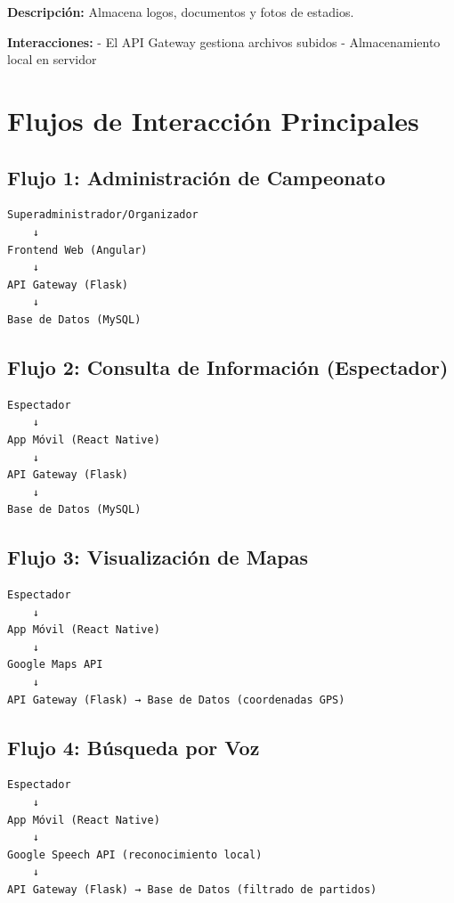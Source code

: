 \documentclass[
  spanish,
  11pt,
  letterpaper,
]{book}
\begin{document}
\textbf{Descripción:} Almacena logos, documentos y fotos de estadios.

\textbf{Interacciones:} - El API Gateway gestiona archivos subidos -
Almacenamiento local en servidor

\section{Flujos de Interacción
Principales}\label{flujos-de-interacciuxf3n-principales}

\subsection{Flujo 1: Administración de
Campeonato}\label{flujo-1-administraciuxf3n-de-campeonato}

\begin{verbatim}
Superadministrador/Organizador
    ↓
Frontend Web (Angular)
    ↓
API Gateway (Flask)
    ↓
Base de Datos (MySQL)
\end{verbatim}

\subsection{Flujo 2: Consulta de Información
(Espectador)}\label{flujo-2-consulta-de-informaciuxf3n-espectador}

\begin{verbatim}
Espectador
    ↓
App Móvil (React Native)
    ↓
API Gateway (Flask)
    ↓
Base de Datos (MySQL)
\end{verbatim}

\subsection{Flujo 3: Visualización de
Mapas}\label{flujo-3-visualizaciuxf3n-de-mapas}

\begin{verbatim}
Espectador
    ↓
App Móvil (React Native)
    ↓
Google Maps API
    ↓
API Gateway (Flask) → Base de Datos (coordenadas GPS)
\end{verbatim}

\subsection{Flujo 4: Búsqueda por
Voz}\label{flujo-4-buxfasqueda-por-voz}

\begin{verbatim}
Espectador
    ↓
App Móvil (React Native)
    ↓
Google Speech API (reconocimiento local)
    ↓
API Gateway (Flask) → Base de Datos (filtrado de partidos)
\end{verbatim}
\end{document}
